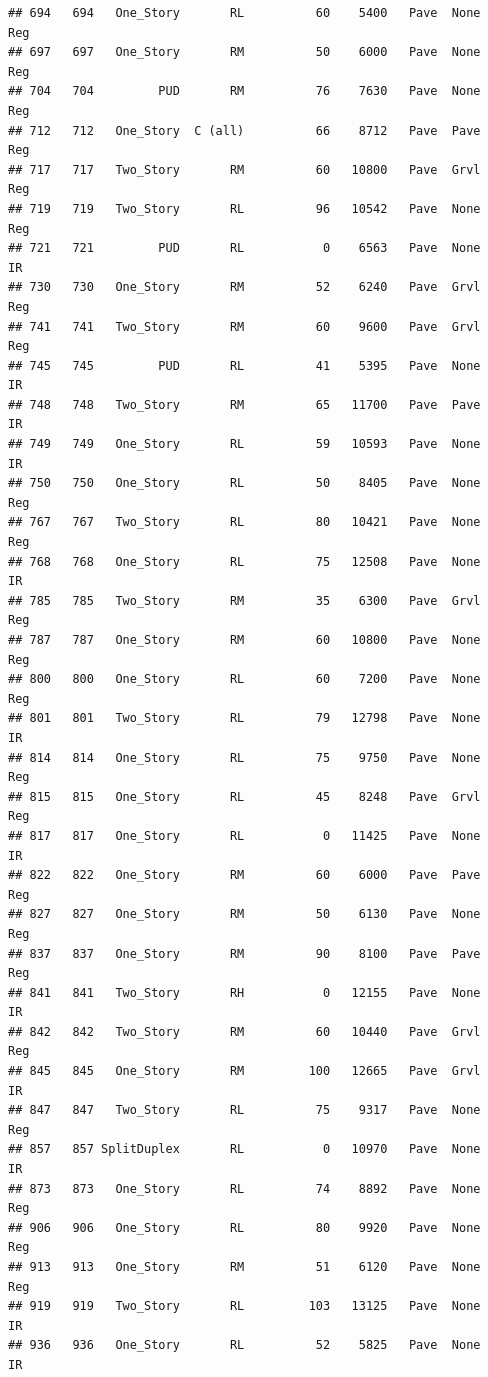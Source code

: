 \documentclass[]{article}
\begin{document}
\begin{verbatim}
## 694   694   One_Story       RL          60    5400   Pave  None      Reg
## 697   697   One_Story       RM          50    6000   Pave  None      Reg
## 704   704         PUD       RM          76    7630   Pave  None      Reg
## 712   712   One_Story  C (all)          66    8712   Pave  Pave      Reg
## 717   717   Two_Story       RM          60   10800   Pave  Grvl      Reg
## 719   719   Two_Story       RL          96   10542   Pave  None      Reg
## 721   721         PUD       RL           0    6563   Pave  None       IR
## 730   730   One_Story       RM          52    6240   Pave  Grvl      Reg
## 741   741   Two_Story       RM          60    9600   Pave  Grvl      Reg
## 745   745         PUD       RL          41    5395   Pave  None       IR
## 748   748   Two_Story       RM          65   11700   Pave  Pave       IR
## 749   749   One_Story       RL          59   10593   Pave  None       IR
## 750   750   One_Story       RL          50    8405   Pave  None      Reg
## 767   767   Two_Story       RL          80   10421   Pave  None      Reg
## 768   768   One_Story       RL          75   12508   Pave  None       IR
## 785   785   Two_Story       RM          35    6300   Pave  Grvl      Reg
## 787   787   One_Story       RM          60   10800   Pave  None      Reg
## 800   800   One_Story       RL          60    7200   Pave  None      Reg
## 801   801   Two_Story       RL          79   12798   Pave  None       IR
## 814   814   One_Story       RL          75    9750   Pave  None      Reg
## 815   815   One_Story       RL          45    8248   Pave  Grvl      Reg
## 817   817   One_Story       RL           0   11425   Pave  None       IR
## 822   822   One_Story       RM          60    6000   Pave  Pave      Reg
## 827   827   One_Story       RM          50    6130   Pave  None      Reg
## 837   837   One_Story       RM          90    8100   Pave  Pave      Reg
## 841   841   Two_Story       RH           0   12155   Pave  None       IR
## 842   842   Two_Story       RM          60   10440   Pave  Grvl      Reg
## 845   845   One_Story       RM         100   12665   Pave  Grvl       IR
## 847   847   Two_Story       RL          75    9317   Pave  None      Reg
## 857   857 SplitDuplex       RL           0   10970   Pave  None       IR
## 873   873   One_Story       RL          74    8892   Pave  None      Reg
## 906   906   One_Story       RL          80    9920   Pave  None      Reg
## 913   913   One_Story       RM          51    6120   Pave  None      Reg
## 919   919   Two_Story       RL         103   13125   Pave  None       IR
## 936   936   One_Story       RL          52    5825   Pave  None       IR

\end{verbatim}
\end{document}
